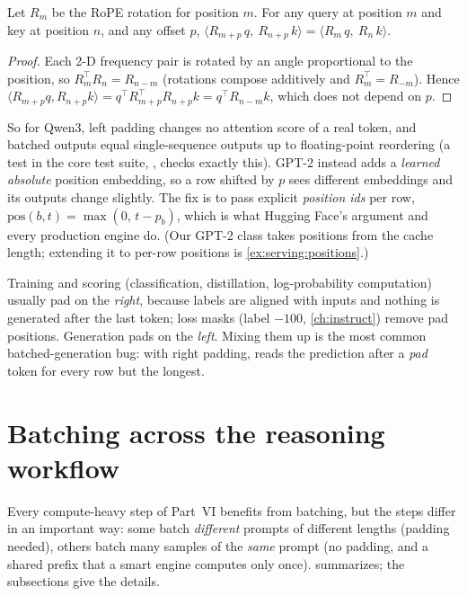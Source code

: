 \begin{proposition}\label{prop:serving:rope}
Let $R_m$ be the RoPE rotation for position $m$. For any query at position $m$ and key at position
$n$, and any offset $p$,
$\langle R_{m+p}\,q,\ R_{n+p}\,k\rangle = \langle R_m\,q,\ R_n\,k\rangle$.
\end{proposition}
\begin{proof}
Each 2-D frequency pair is rotated by an angle proportional to the position, so
$R_m^\top R_n = R_{n-m}$ (rotations compose additively and $R_m^\top=R_{-m}$). Hence
$\langle R_{m+p}q,R_{n+p}k\rangle = q^\top R_{m+p}^\top R_{n+p}k = q^\top R_{n-m}k$, which does not depend on $p$.
\end{proof}

So for Qwen3, left padding changes no attention score of a real token, and batched outputs equal
single-sequence outputs up to floating-point reordering (a test in the core
test suite, , checks exactly this). GPT-2 instead adds a
\emph{learned absolute} position embedding, so a row shifted by $p$ sees different embeddings and
its outputs change slightly. The fix is to pass explicit \emph{position ids} per row,
$\text{pos}(b,t)=\max(0,\,t-p_b)$, which is what Hugging Face's  argument and
every production engine do. (Our GPT-2 class takes positions from the cache length; extending it to
per-row positions is \cref{ex:serving:positions}.)

\begin{pitfall}
Training and scoring (classification, distillation, log-probability computation) usually pad on the
\emph{right}, because labels are aligned with inputs and nothing is generated after the last token;
loss masks (label $-100$, \cref{ch:instruct}) remove pad positions. Generation pads on the \emph{left}.
Mixing them up is the most common batched-generation bug: with right padding,  reads
the prediction after a \emph{pad} token for every row but the longest.
\end{pitfall}

\section{Batching across the reasoning workflow}\label{sec:serving:workflows}

Every compute-heavy step of Part~VI benefits from batching, but the steps differ in an important way:
some batch \emph{different} prompts of different lengths (padding needed), others batch many samples
of the \emph{same} prompt (no padding, and a shared prefix that a smart engine computes only once).
 summarizes; the subsections give the details.

